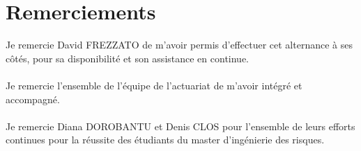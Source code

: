 \chapter*{Remerciements} 

Je remercie David FREZZATO de m'avoir permis d'effectuer cet alternance à ses côtés, pour sa disponibilité et son assistance en continue.  	
\\
\\
Je remercie l'ensemble de l'équipe de l’actuariat de m'avoir intégré et accompagné.
\\
\\
Je remercie Diana DOROBANTU et Denis CLOS pour l'ensemble de leurs efforts continues pour la réussite des étudiants du master d'ingénierie des risques.
